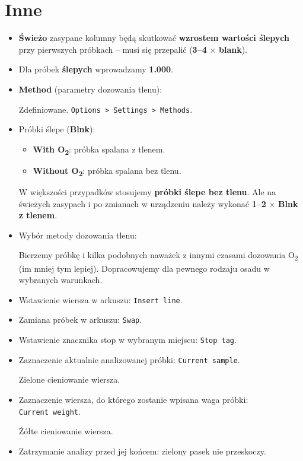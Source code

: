 \documentclass[
  letterpaper,
  DIV=11,
  numbers=noendperiod]{scrreprt}
\begin{document}
\hypertarget{inne}{%
\section{Inne}\label{inne}}

\begin{itemize}
\item
  \textbf{Świeżo} zasypane kolumny będą skutkować \textbf{wzrostem
  wartości ślepych} przy pierwszych próbkach -- musi się przepalić
  (\textbf{3--4} × \textbf{blank}).
\item
  Dla próbek \textbf{ślepych} wprowadzamy \textbf{1.000}.
\item
  \textbf{Method} (parametry dozowania tlenu):

  Zdefiniowane.
  \texttt{Options\ \textgreater{}\ Settings\ \textgreater{}\ Methods}.
\item
  Próbki ślepe (\textbf{Blnk}):

  \begin{itemize}
  \item
    \textbf{With O\textsubscript{2}}: próbka spalana z tlenem.
  \item
    \textbf{Without O\textsubscript{2}}: próbka spalana bez tlenu.
  \end{itemize}

  W większości przypadków stosujemy \textbf{próbki ślepe bez tlenu}. Ale
  na świeżych zasypach i po zmianach w urządzeniu należy wykonać
  \textbf{1--2} × \textbf{Blnk z tlenem}.
\item
  Wybór metody dozowania tlenu:

  Bierzemy próbkę i kilka podobnych naważek z innymi czasami dozowania
  O\textsubscript{2} (im mniej tym lepiej). Dopracowujemy dla pewnego
  rodzaju osadu w wybranych warunkach.
\item
  Wstawienie wiersza w arkuszu: \texttt{Insert\ line}.
\item
  Zamiana próbek w arkuszu: \texttt{Swap}.
\item
  Wstawienie znacznika stop w wybranym miejscu: \texttt{Stop\ tag}.
\item
  Zaznaczenie aktualnie analizowanej próbki: \texttt{Current\ sample}.

  Zielone cieniowanie wiersza.
\item
  Zaznaczenie wiersza, do którego zostanie wpisana waga próbki:
  \texttt{Current\ weight}.

  Żółte cieniowanie wiersza.
\item
  Zatrzymanie analizy przed jej końcem: zielony pasek nie przeskoczy.


\end{itemize}
\end{document}
